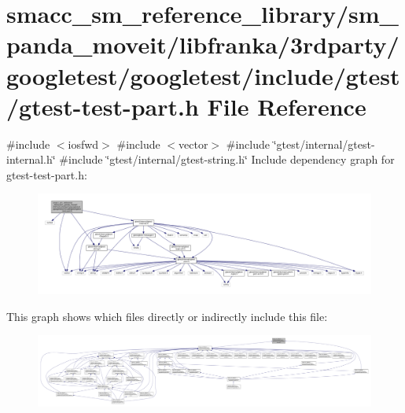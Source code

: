 \hypertarget{gtest-test-part_8h}{}\section{smacc\+\_\+sm\+\_\+reference\+\_\+library/sm\+\_\+panda\+\_\+moveit/libfranka/3rdparty/googletest/googletest/include/gtest/gtest-\/test-\/part.h File Reference}
\label{gtest-test-part_8h}
{\ttfamily \#include $<$iosfwd$>$}\newline
{\ttfamily \#include $<$vector$>$}\newline
{\ttfamily \#include \char`\"{}gtest/internal/gtest-\/internal.\+h\char`\"{}}\newline
{\ttfamily \#include \char`\"{}gtest/internal/gtest-\/string.\+h\char`\"{}}\newline
Include dependency graph for gtest-\/test-\/part.h\+:
\nopagebreak
\begin{figure}[H]
\begin{center}
\leavevmode
\includegraphics[width=350pt]{gtest-test-part_8h__incl}
\end{center}
\end{figure}
This graph shows which files directly or indirectly include this file\+:
\nopagebreak
\begin{figure}[H]
\begin{center}
\leavevmode
\includegraphics[width=350pt]{gtest-test-part_8h__dep__incl}
\end{center}
\end{figure}
